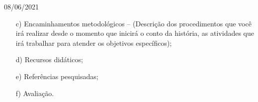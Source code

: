 \documentclass{SchoolBook}
\begin{document}
\begin{day}{08/06/2021}
\begin{enumerate}
            \item[c)] Encaminhamentos metodológicos -- (Descrição dos procedimentos que você irá realizar desde o momento que inicirá o conto da história, as atividades que irá trabalhar para atender os objetivos específicos);
            
            \item[d)] Recursos didáticos;
            \item[e)] Referências pesquisadas;
            \item[f)] Avaliação.
        \end{enumerate}
    \end{day}
\end{document}
